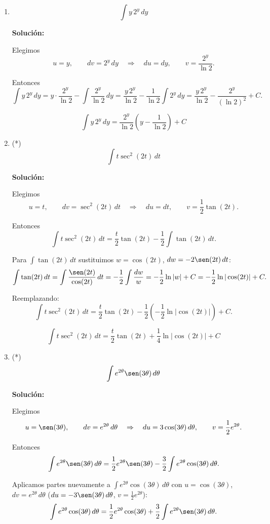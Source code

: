 \documentclass[12pt]{article}
\newcommand{\solucion}{%
    \vspace{0.8em}%
    \textbf{Solución:}%
}
\begin{document}
\begin{enumerate}[label=\alph*.-]
    \[
    \boxed{
    \int z^5\ln z\,dz=\frac{z^6}{6}\left(\ln z-\frac16\right)+C
    }
    \]


    \item
    \[
    \int y\,2^y\,dy
    \]

    \solucion

    Elegimos
    \[
    u=y,\qquad dv=2^y\,dy
    \quad\Rightarrow\quad
    du=dy,\qquad v=\frac{2^y}{\ln2}.
    \]

    Entonces
    \[
    \int y\,2^y\,dy
    =y\cdot\frac{2^y}{\ln2}-\int\frac{2^y}{\ln2}\,dy
    =\frac{y\,2^y}{\ln2}-\frac{1}{\ln2}\int2^y\,dy
    =\frac{y\,2^y}{\ln2}-\frac{2^y}{(\ln2)^2}+C.
    \]

    \[
    \boxed{
    \int y\,2^y\,dy=\frac{2^y}{\ln2}\left(y-\frac{1}{\ln2}\right)+C
    }
    \]


    \item (*)
    \[
    \int t\sec^2(2t)\,dt
    \]

    \solucion

    Elegimos
    \[
    u=t,\qquad dv=\sec^2(2t)\,dt
    \quad\Rightarrow\quad
    du=dt,\qquad v=\frac12\tan(2t).
    \]

    Entonces
    \[
    \int t\sec^2(2t)\,dt
    =\frac{t}{2}\tan(2t)-\frac12\int\tan(2t)\,dt.
    \]

    Para $\displaystyle\int\tan(2t)\,dt$ sustituimos $w=\cos(2t)$,
    $dw=-2\sen(2t)\,dt$:
    \[
    \int\tan(2t)\,dt=\int\frac{\sen(2t)}{\cos(2t)}\,dt
    =-\frac12\int\frac{dw}{w}=-\frac12\ln|w|+C=-\frac12\ln|\cos(2t)|+C.
    \]

    Reemplazando:
    \[
    \int t\sec^2(2t)\,dt
    =\frac{t}{2}\tan(2t)-\frac12\left(-\frac12\ln|\cos(2t)|\right)+C.
    \]

    \[
    \boxed{
    \int t\sec^2(2t)\,dt=\frac{t}{2}\tan(2t)+\frac14\ln|\cos(2t)|+C
    }
    \]


    \item (*)
    \[
    \int e^{2\theta}\sen(3\theta)\,d\theta
    \]

    \solucion

    Elegimos
    \[
    u=\sen(3\theta),\qquad dv=e^{2\theta}\,d\theta
    \quad\Rightarrow\quad
    du=3\cos(3\theta)\,d\theta,\qquad v=\frac12e^{2\theta}.
    \]

    Entonces
    \[
    \int e^{2\theta}\sen(3\theta)\,d\theta
    =\frac12e^{2\theta}\sen(3\theta)-\frac32\int e^{2\theta}\cos(3\theta)\,d\theta.
    \]

    Aplicamos partes nuevamente a $\displaystyle\int e^{2\theta}\cos(3\theta)\,d\theta$
    con $u=\cos(3\theta)$, $dv=e^{2\theta}\,d\theta$
    ($du=-3\sen(3\theta)\,d\theta$, $v=\tfrac12e^{2\theta}$):
    \[
    \int e^{2\theta}\cos(3\theta)\,d\theta
    =\frac12e^{2\theta}\cos(3\theta)+\frac32\int e^{2\theta}\sen(3\theta)\,d\theta.
    \]


\end{enumerate}
\end{document}
